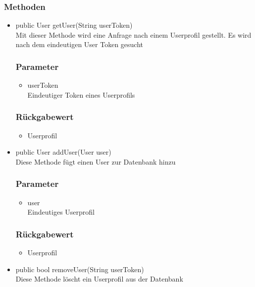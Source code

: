 \documentclass[a4paper]{scrreprt}
\begin{document}
\subsubsection*{Methoden}
\begin{addmargin}[25pt]{0pt}
\begin{itemize}

\item public User getUser(String userToken)\\
	Mit dieser Methode wird eine Anfrage nach einem Userprofil gestellt. Es wird nach dem eindeutigen User Token gesucht
	\subsubsection*{Parameter}
	\begin{itemize}
	\item userToken \\
		Eindeutiger Token eines Userprofils
	\end{itemize}
	\subsubsection*{Rückgabewert}
	\begin{itemize}
	\item Userprofil
	\end{itemize}

\item public User addUser(User user)\\
	Diese Methode fügt einen User zur Datenbank hinzu
	\subsubsection*{Parameter}
	\begin{itemize}
	\item user \\
		Eindeutiges Userprofil
	\end{itemize}
	\subsubsection*{Rückgabewert}
	\begin{itemize}
	\item Userprofil
	\end{itemize}
	
\item public bool removeUser(String userToken)\\
	Diese Methode löscht ein Userprofil aus der Datenbank

\end{itemize}
\end{addmargin}
\end{document}
